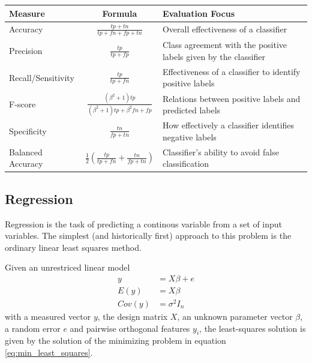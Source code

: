 \begin{center}
    \begin{tabularx}{\textwidth}{l c X}
    Measure & Formula & Evaluation Focus \\ 
    \hline
    Accuracy & $\frac{tp+tn}{tp+fn+fp+tn}$ & Overall effectiveness of a classifier \\ 
    Precision & $\frac{tp}{tp+fp}$ & Class agreement with the positive labels given by the classifier \\
    Recall/Sensitivity & $\frac{tp}{tp+fn}$ & Effectiveness of a classifier to identify positive labels \\
    F-score & $\frac{(\beta^2+1)tp}{(\beta^2+1)tp+\beta^2fn+fp}$ & Relations between positive labels and predicted labels\\
    Specificity & $\frac{tn}{fp+tn}$ & How effectively a classifier identifies negative labels \\ 
    Balanced Accuracy & $\frac{1}{2}(\frac{tp}{tp+fn}+\frac{tn}{fp+tn})$ & Classifier’s ability to avoid false classification \\ 
    \end{tabularx}
\end{center}

\subsection{Regression}
Regression is the task of predicting a continous variable
from a set of input variables.
The simplest (and historically first) approach 
to this problem is the ordinary linear least squares method.

Given an unrestriced linear model
\begin{align}
	y &= X\beta + e \\
	E(y) &= X\beta \\
	Cov(y) &= \sigma^2 I_n
\end{align}
with a measured vector $y$, the design matrix $X$,
an unknown parameter vector $\beta$, a random error $e$ 
and pairwise orthogonal features $y_i$,
the least-squares solution is given by the solution of 
the minimizing problem in equation \ref{eq:min_least_squares}.

